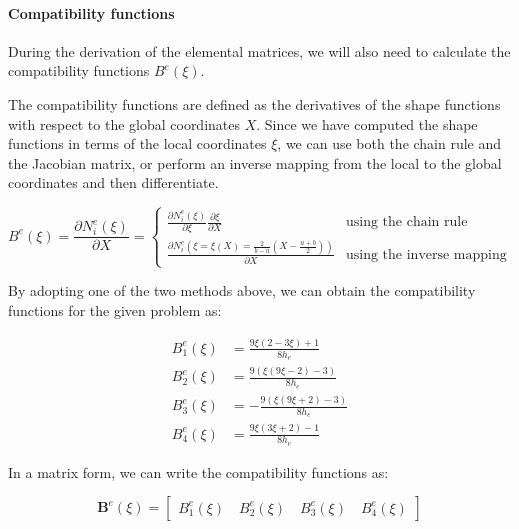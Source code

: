 \paragraph{Compatibility functions}

During the derivation of the elemental matrices, we will also need to calculate the compatibility functions $B^e(\xi)$.

The compatibility functions are defined as the derivatives of the shape functions with respect to the global coordinates $X$.
Since we have computed the shape functions in terms of the local coordinates $\xi$, we can use both the chain rule and the Jacobian matrix, or perform an inverse mapping from the local to the global coordinates and then differentiate.

\begin{equation}
    B^e(\xi) = \frac{\partial N_i^e(\xi)}{\partial X} =
    \begin{cases}
        \frac{\partial N_i^e(\xi)}{\partial \xi} \frac{\partial \xi}{\partial X}            & \text{using the chain rule}      \\
        \frac{\partial N_i^e(\xi = \xi(X) = \frac{2}{b-a} (X - \frac{a+b}{2}))}{\partial X} & \text{using the inverse mapping}
    \end{cases}
\end{equation}

By adopting one of the two methods above, we can obtain the compatibility functions for the given problem as:

\begin{align}
    B_1^e(\xi) & = \frac{9 \xi (2-3 \xi )+1}{8 h_e}    \\
    B_2^e(\xi) & = \frac{9 (\xi (9 \xi -2)-3)}{8 h_e}  \\
    B_3^e(\xi) & = -\frac{9 (\xi (9 \xi +2)-3)}{8 h_e} \\
    B_4^e(\xi) & = \frac{9 \xi (3 \xi +2)-1}{8 h_e}
\end{align}

In a matrix form, we can write the compatibility functions as:

\begin{equation}
    \mathbf{B}^e(\xi) = \begin{bmatrix}
        B_1^e(\xi) \quad B_2^e(\xi) \quad B_3^e(\xi) \quad B_4^e(\xi)
    \end{bmatrix}
\end{equation}
